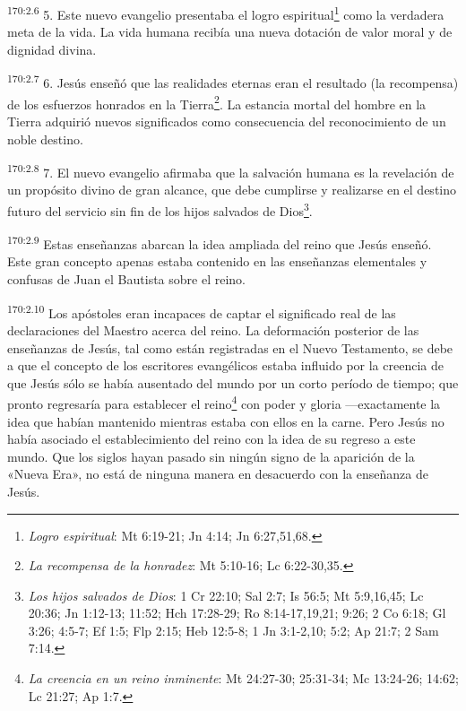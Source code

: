 \par 
\textsuperscript{170:2.6} 5. Este nuevo evangelio presentaba el logro espiritual\footnote{\textit{Logro espiritual}: Mt 6:19-21; Jn 4:14; Jn 6:27,51,68.} como la verdadera meta de la vida. La vida humana recibía una nueva dotación de valor moral y de dignidad divina.

\par 
\textsuperscript{170:2.7} 6. Jesús enseñó que las realidades eternas eran el resultado (la recompensa) de los esfuerzos honrados en la Tierra\footnote{\textit{La recompensa de la honradez}: Mt 5:10-16; Lc 6:22-30,35.}. La estancia mortal del hombre en la Tierra adquirió nuevos significados como consecuencia del reconocimiento de un noble destino.

\par 
\textsuperscript{170:2.8} 7. El nuevo evangelio afirmaba que la salvación humana es la revelación de un propósito divino de gran alcance, que debe cumplirse y realizarse en el destino futuro del servicio sin fin de los hijos salvados de Dios\footnote{\textit{Los hijos salvados de Dios}: 1 Cr 22:10; Sal 2:7; Is 56:5; Mt 5:9,16,45; Lc 20:36; Jn 1:12-13; 11:52; Hch 17:28-29; Ro 8:14-17,19,21; 9:26; 2 Co 6:18; Gl 3:26; 4:5-7; Ef 1:5; Flp 2:15; Heb 12:5-8; 1 Jn 3:1-2,10; 5:2; Ap 21:7; 2 Sam 7:14.}.

\par 
\textsuperscript{170:2.9} Estas enseñanzas abarcan la idea ampliada del reino que Jesús enseñó. Este gran concepto apenas estaba contenido en las enseñanzas elementales y confusas de Juan el Bautista sobre el reino.

\par 
\textsuperscript{170:2.10} Los apóstoles eran incapaces de captar el significado real de las declaraciones del Maestro acerca del reino. La deformación posterior de las enseñanzas de Jesús, tal como están registradas en el Nuevo Testamento, se debe a que el concepto de los escritores evangélicos estaba influido por la creencia de que Jesús sólo se había ausentado del mundo por un corto período de tiempo; que pronto regresaría para establecer el reino\footnote{\textit{La creencia en un reino inminente}: Mt 24:27-30; 25:31-34; Mc 13:24-26; 14:62; Lc 21:27; Ap 1:7.} con poder y gloria ---exactamente la idea que habían mantenido mientras estaba con ellos en la carne. Pero Jesús no había asociado el establecimiento del reino con la idea de su regreso a este mundo. Que los siglos hayan pasado sin ningún signo de la aparición de la «Nueva Era», no está de ninguna manera en desacuerdo con la enseñanza de Jesús.

